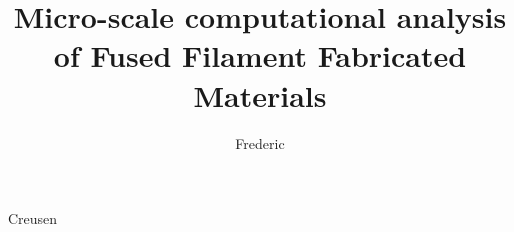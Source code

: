 \documentclass{dissertation}
\begin{document}
\title[Experimentally-validated Finite Element Analyses of Representative Volume Elements]{Micro-scale computational analysis of Fused Filament Fabricated Materials}  
\author{Frederic}{Creusen} %

\frontmatter






\tableofcontents

\mainmatter

\thumbtrue







 
% 



\appendix

%
%

\thumbfalse

\end{document}
